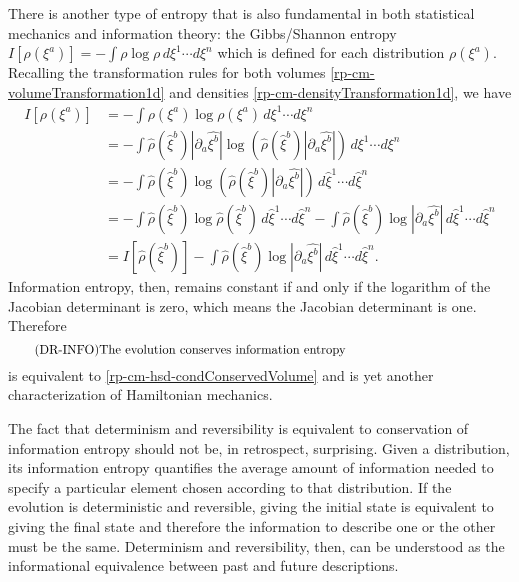 There is another type of entropy that is also fundamental in both statistical mechanics and information theory: the Gibbs/Shannon entropy $I[\rho(\xi^a)]=-\int \rho \log \rho \, d\xi^1 \cdots d\xi^n$ which is defined for each distribution $\rho(\xi^a)$. Recalling the transformation rules for both volumes \ref{rp-cm-volumeTransformation1d} and densities \ref{rp-cm-densityTransformation1d}, we have
\begin{equation}
	\begin{aligned}
	I[\rho(\xi^a)] &= - \int \rho(\xi^a) \log \rho(\xi^a) \, d\xi^1 \cdots d\xi^n \\
&= - \int  \hat{\rho}(\hat{\xi}^b) \left| \partial_a \hat{\xi^b} \right| \log \left( \hat{\rho}(\hat{\xi}^b) \left| \partial_a \hat{\xi^b} \right| \right) \, d\xi^1 \cdots d\xi^n \\
&= - \int \hat{\rho}(\hat{\xi}^b) \log \left( \hat{\rho}(\hat{\xi}^b) \left| \partial_a \hat{\xi^b} \right| \right) \, d\hat{\xi}^1 \cdots d\hat{\xi}^n \\
&= - \int \hat{\rho}(\hat{\xi}^b) \log \hat{\rho}(\hat{\xi}^b) \, d\hat{\xi}^1 \cdots d\hat{\xi}^n - \int \hat{\rho}(\hat{\xi}^b) \log \left| \partial_a \hat{\xi^b} \right| \, d\hat{\xi}^1 \cdots d\hat{\xi}^n \\
&= I[\hat{\rho}(\hat{\xi}^b)] - \int \hat{\rho}(\hat{\xi}^b) \log \left| \partial_a \hat{\xi^b} \right| \, d\hat{\xi}^1 \cdots d\hat{\xi}^n.
	\end{aligned}
\end{equation}
Information entropy, then, remains constant if and only if the logarithm of the Jacobian determinant is zero, which means the Jacobian determinant is one. Therefore
\begin{equation}\label{rp-cm-hsd-condInformation}
	\tag{DR-INFO}
	\eqtext{The evolution conserves information entropy}	
\end{equation}
is equivalent to \ref{rp-cm-hsd-condConservedVolume} and is yet another characterization of Hamiltonian mechanics.

The fact that determinism and reversibility is equivalent to conservation of information entropy should not be, in retrospect, surprising. Given a distribution, its information entropy quantifies the average amount of information needed to specify a particular element chosen according to that distribution. If the evolution is deterministic and reversible, giving the initial state is equivalent to giving the final state and therefore the information to describe one or the other must be the same. Determinism and reversibility, then, can be understood as the informational equivalence between past and future descriptions.

